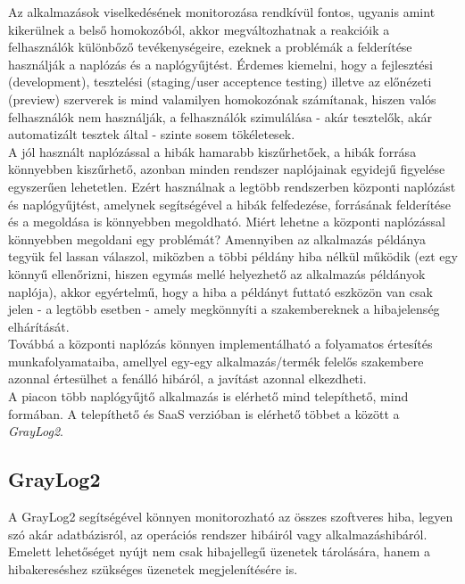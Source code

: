 Az alkalmazások viselkedésének monitorozása rendkívül fontos, ugyanis amint kikerülnek a belső homokozóból, akkor megváltozhatnak a reakcióik a felhasználók különbőző tevékenységeire, ezeknek a problémák a felderítése használják a naplózás és a naplógyűjtést. Érdemes kiemelni, hogy a fejlesztési (development), tesztelési (staging/user acceptence testing) illetve az előnézeti (preview) szerverek is mind valamilyen homokozónak számítanak, hiszen valós felhasználók nem használják, a felhasználók szimulálása - akár tesztelők, akár automatizált tesztek által - szinte sosem tökéletesek.
\\
A jól használt naplózással a hibák hamarabb kiszűrhetőek, a hibák forrása könnyebben kiszűrhető, azonban minden rendszer naplójainak egyidejű figyelése egyszerűen lehetetlen. Ezért használnak a legtöbb rendszerben központi naplózást és naplógyűjtést, amelynek segítségével a hibák felfedezése, forrásának felderítése és a megoldása is könnyebben megoldható. Miért lehetne a központi naplózással könnyebben megoldani egy problémát? Amennyiben az alkalmazás példánya tegyük fel lassan válaszol, miközben a többi példány hiba nélkül működik (ezt egy könnyű ellenőrizni, hiszen egymás mellé helyezhető az alkalmazás példányok naplója), akkor egyértelmű, hogy a hiba a példányt futtató eszközön van csak jelen - a legtöbb esetben - amely megkönnyíti a szakembereknek a hibajelenség elhárítását.
\\
Továbbá a központi naplózás könnyen implementálható a folyamatos értesítés munkafolyamataiba, amellyel egy-egy alkalmazás/termék felelős szakembere azonnal értesülhet a fenálló hibáról, a javítást azonnal elkezdheti.
\\ 
A piacon több naplógyűjtő alkalmazás is elérhető mind telepíthető, mind  formában. A telepíthető és SaaS verzióban is elérhető többet a között a \emph{GrayLog2}.
\\
\subsection{GrayLog2}
A GrayLog2 segítségével könnyen monitorozható az összes szoftveres hiba, legyen szó akár adatbázisról, az operációs rendszer hibáiról vagy alkalmazáshibáról. Emelett lehetőséget nyújt nem csak hibajellegű üzenetek tárolására, hanem a hibakereséshez szükséges üzenetek megjelenítésére is.

